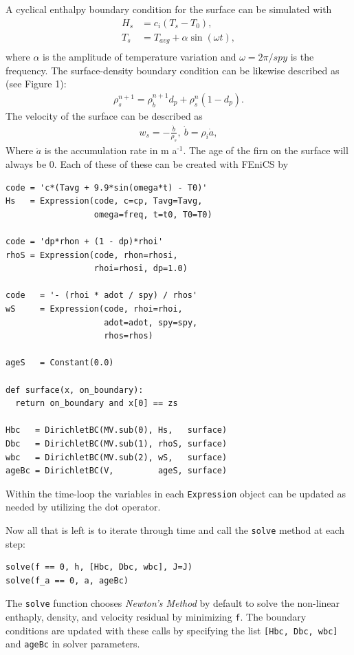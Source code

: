 \documentclass{article}%
\newcommand{\sups}[1]{\ensuremath{^{\textrm{#1}}}}
\begin{document}
A cyclical enthalpy boundary condition for the surface can be simulated with 
\begin{align*}
    H_s &= c_i ( T_s - T_0 ),\\
    T_s &= T_{avg} + \alpha \sin(\omega t),\\
\end{align*}
where $\alpha$ is the amplitude of temperature variation and $\omega = 2\pi / spy$ is the frequency.  The surface-density boundary condition can be likewise described as (see Figure 1): 
\begin{align*}
    \rho_s^{n+1} = \rho_{\dot{b}}^{n+1} d_p + \rho_s^{n} (1 - d_p).
\end{align*}
The velocity of the surface can be described as 
\begin{align*}
  w_s = -\frac{\dot{b}}{\rho_s},\ \dot{b} = \rho_i \dot{a},
\end{align*}
Where $\dot{a}$ is the accumulation rate in m a\sups{-1}.
The age of the firn on the surface will always be 0.
Each of these of these can be created with FEniCS by
\footnotesize
\begin{verbatim}
code = 'c*(Tavg + 9.9*sin(omega*t) - T0)'
Hs   = Expression(code, c=cp, Tavg=Tavg, 
                  omega=freq, t=t0, T0=T0)

code = 'dp*rhon + (1 - dp)*rhoi'
rhoS = Expression(code, rhon=rhosi, 
                  rhoi=rhosi, dp=1.0)

code   = '- (rhoi * adot / spy) / rhos'
wS     = Expression(code, rhoi=rhoi, 
                    adot=adot, spy=spy, 
                    rhos=rhos)

ageS   = Constant(0.0)

def surface(x, on_boundary):
  return on_boundary and x[0] == zs

Hbc   = DirichletBC(MV.sub(0), Hs,   surface)
Dbc   = DirichletBC(MV.sub(1), rhoS, surface)
wbc   = DirichletBC(MV.sub(2), wS,   surface)
ageBc = DirichletBC(V,         ageS, surface)
\end{verbatim}
\normalsize
Within the time-loop the variables in each \texttt{Expression} object can be updated as needed by utilizing the dot operator.

Now all that is left is to iterate through time and call the \texttt{solve} method at each step:\par
\footnotesize
\begin{verbatim}
solve(f == 0, h, [Hbc, Dbc, wbc], J=J)
solve(f_a == 0, a, ageBc)
\end{verbatim}
\normalsize
The \texttt{solve} function chooses \emph{Newton's Method} by default to solve the non-linear enthaply, density, and velocity residual by minimizing \texttt{f}.  The boundary conditions are updated with these calls by specifying the list \texttt{[Hbc, Dbc, wbc]} and \texttt{ageBc} in solver parameters.
\end{document}
